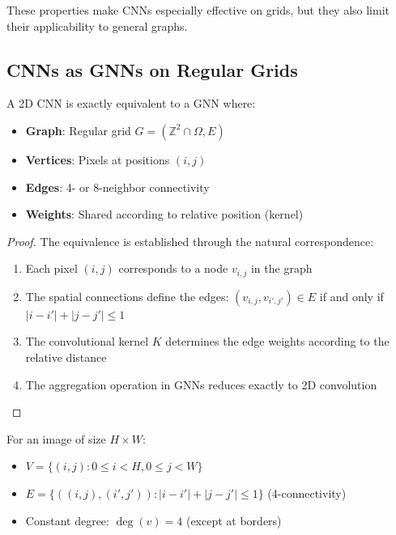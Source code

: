 These properties make CNNs especially effective on grids, but they also limit their applicability to general graphs.

\subsection[CNNs as GNNs on Regular Grids]{\glspl{CNN} as \glspl{GNN} on Regular Grids}\label{subsec:cnns_como_gnns_grillas}

\begin{theorem}\label{thm:cnn_caso_especial_gnn}
A 2D \gls{CNN} is exactly equivalent to a \gls{GNN} where:
\begin{itemize}
	\item \textbf{Graph}: Regular grid \(G = (\mathbb{Z}^2 \cap \Omega, E)\)
	\item \textbf{Vertices}: Pixels at positions \((i,j)\)
	\item \textbf{Edges}: 4- or 8-neighbor connectivity
	\item \textbf{Weights}: Shared according to relative position (kernel)
\end{itemize}
\end{theorem}

\begin{proof}
The equivalence is established through the natural correspondence:
\begin{enumerate}
	\item Each pixel \((i,j)\) corresponds to a node \(v_{i,j}\) in the graph
	\item The spatial connections define the edges: \((v_{i,j}, v_{i',j'}) \in E\) if and only if \(|i-i'| + |j-j'| \leq 1\)
	\item The convolutional kernel \(K\) determines the edge weights according to the relative distance
	\item The aggregation operation in \glspl{GNN} reduces exactly to 2D convolution
\end{enumerate}
\end{proof}

\begin{definition}\label{def:grilla_como_grafo}
For an image of size \(H \times W\):
\begin{itemize}
	\item \(V = \{(i,j) : 0 \leq i < H, 0 \leq j < W\}\)
	\item \(E = \{((i,j), (i',j')) : |i-i'| + |j-j'| \leq 1\}\) (4-connectivity)
	\item Constant degree: \(\deg(v) = 4\) (except at borders)
\end{itemize}
\end{definition}

